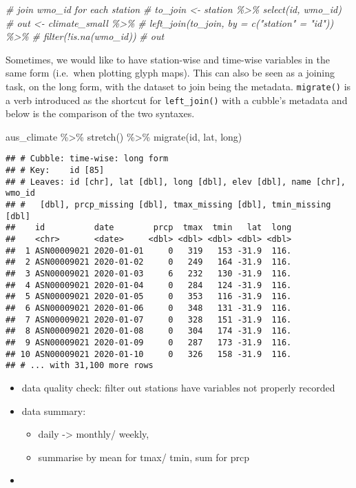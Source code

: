 \documentclass{article}
\newenvironment{Shaded}{\begin{snugshade}}{\end{snugshade}}
\newcommand{\CommentTok}[1]{\textcolor[rgb]{0.56,0.35,0.01}{\textit{#1}}}
\newcommand{\FunctionTok}[1]{\textcolor[rgb]{0.00,0.00,0.00}{#1}}
\newcommand{\NormalTok}[1]{#1}
\newcommand{\SpecialCharTok}[1]{\textcolor[rgb]{0.00,0.00,0.00}{#1}}
\begin{document}
\begin{Shaded}
\begin{Highlighting}[]
\CommentTok{\# join wmo\_id for each station}
\CommentTok{\# to\_join \textless{}{-} station \%\textgreater{}\% select(id, wmo\_id)}
\CommentTok{\# out \textless{}{-} climate\_small \%\textgreater{}\% }
\CommentTok{\#   left\_join(to\_join, by = c("station" = "id")) \%\textgreater{}\% }
\CommentTok{\#   filter(!is.na(wmo\_id))}
\CommentTok{\# out}
\end{Highlighting}
\end{Shaded}

Sometimes, we would like to have station-wise and time-wise variables in
the same form (i.e.~when plotting glyph maps). This can also be seen as
a joining task, on the long form, with the dataset to join being the
metadata. \texttt{migrate()} is a verb introduced as the shortcut for
\texttt{left\_join()} with a cubble's metadata and below is the
comparison of the two syntaxes.

\begin{Shaded}
\begin{Highlighting}[]
\NormalTok{aus\_climate }\SpecialCharTok{\%\textgreater{}\%} 
  \FunctionTok{stretch}\NormalTok{() }\SpecialCharTok{\%\textgreater{}\%} 
  \FunctionTok{migrate}\NormalTok{(id, lat, long)}
\end{Highlighting}
\end{Shaded}

\begin{verbatim}
## # Cubble: time-wise: long form
## # Key:    id [85]
## # Leaves: id [chr], lat [dbl], long [dbl], elev [dbl], name [chr], wmo_id
## #   [dbl], prcp_missing [dbl], tmax_missing [dbl], tmin_missing [dbl]
##    id          date        prcp  tmax  tmin   lat  long
##    <chr>       <date>     <dbl> <dbl> <dbl> <dbl> <dbl>
##  1 ASN00009021 2020-01-01     0   319   153 -31.9  116.
##  2 ASN00009021 2020-01-02     0   249   164 -31.9  116.
##  3 ASN00009021 2020-01-03     6   232   130 -31.9  116.
##  4 ASN00009021 2020-01-04     0   284   124 -31.9  116.
##  5 ASN00009021 2020-01-05     0   353   116 -31.9  116.
##  6 ASN00009021 2020-01-06     0   348   131 -31.9  116.
##  7 ASN00009021 2020-01-07     0   328   151 -31.9  116.
##  8 ASN00009021 2020-01-08     0   304   174 -31.9  116.
##  9 ASN00009021 2020-01-09     0   287   173 -31.9  116.
## 10 ASN00009021 2020-01-10     0   326   158 -31.9  116.
## # ... with 31,100 more rows
\end{verbatim}

\begin{itemize}
\tightlist
\item
  data quality check: filter out stations have variables not properly
  recorded
\item
  data summary:

  \begin{itemize}
  \tightlist
  \item
    daily -\textgreater{} monthly/ weekly,
  \item
    summarise by mean for tmax/ tmin, sum for prcp
  \end{itemize}
\item
\end{itemize}
\end{document}
